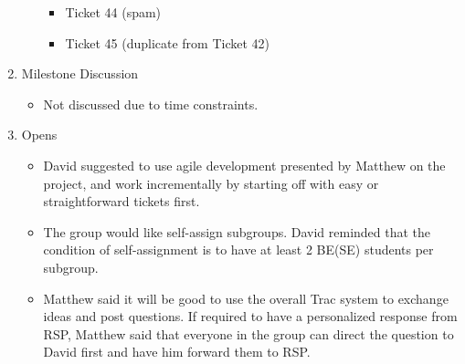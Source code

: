 \documentclass{letter}
\begin{document}
\begin{enumerate}
\begin{itemize}
\begin{itemize}
			\item Ticket 44 (spam)
			\item Ticket 45 (duplicate from Ticket 42)
		\end{itemize}
	\end{itemize}
\item Milestone Discussion
	\begin{itemize}
	\item Not discussed due to time constraints. 
	\end{itemize}
\item Opens
	\begin{itemize}
	\item David suggested to use agile development presented by Matthew on the project, and work incrementally by starting off with easy or straightforward tickets first. 
	\item The group would like self-assign subgroups. David reminded that the condition of self-assignment is to have at least 2 BE(SE) students per subgroup. 
	\item Matthew said it will be good to use the overall Trac system to exchange ideas and post questions. If required to have a personalized response from RSP, Matthew said that everyone in the group can direct the question to David first and have him forward them to RSP. 
	\end{itemize}
\end{enumerate} 
\end{document}
